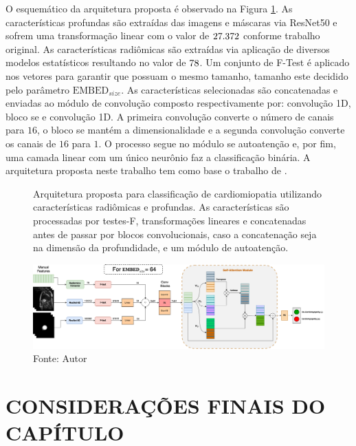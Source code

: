 O esquemático da arquitetura proposta é observado na Figura \ref{fig:fig011}. As características profundas são extraídas das imagens e máscaras via ResNet50 e sofrem uma transformação linear com o valor de $27.372$ conforme trabalho original. As características radiômicas são extraídas via aplicação de diversos modelos estatísticos resultando no valor de $78$. Um conjunto de F-Test é aplicado nos vetores para garantir que possuam o mesmo tamanho, tamanho este decidido pelo parâmetro $\text{EMBED}_{size}$. As características selecionadas são concatenadas e enviadas ao módulo de convolução composto respectivamente por: convolução 1D, bloco \gls{se} e convolução 1D. A primeira convolução converte o número de canais para $16$, o bloco \gls{se} mantém a dimensionalidade e a segunda convolução converte os canais de $16$ para $1$. O processo segue no módulo se autoatenção e, por fim, uma camada linear com um único neurônio faz a classificação binária. A arquitetura proposta neste trabalho tem como base o trabalho de \cite{aiSelfAttentionBasedFusion2023}.
\newline

\begin{figure}[H]
    \centering
    \captionsetup{width=0.98\textwidth, justification=justified}
    \caption{Arquitetura proposta para classificação de cardiomiopatia utilizando características radiômicas e profundas. As características são processadas por testes-F, transformações lineares e concatenadas antes de passar por blocos convolucionais, caso a concatenação seja na dimensão da profundidade, e um módulo de autoatenção.
    }
    \includegraphics[width=1.02\textwidth]{figures/fig011.png}
    \caption*{Fonte: Autor}
    \label{fig:fig011}
\end{figure}

\section{CONSIDERAÇÕES FINAIS DO CAPÍTULO}
\label{sec:cap4_consideracoes_finais}

